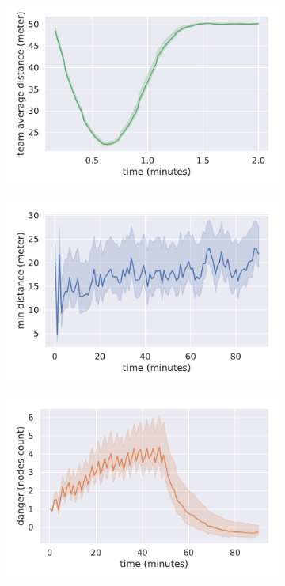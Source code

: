 \begin{figure}[t]
\centering
\begin{subfigure}{0.4\textwidth}
  \centering
  \includegraphics[width=\textwidth]{papers/coordination2023-macro/images/average_intra_team_distance}
  \caption{}
  \label{coordination2023-macro:fig:distance}
\end{subfigure}
\hfill
\begin{subfigure}{0.4\textwidth}
  \centering
  \includegraphics[width=\textwidth]{papers/coordination2023-macro/images/min_distance}
  \caption{}
  \label{coordination2023-macro:fig:min_distance}
\end{subfigure}
\hfill
\begin{subfigure}{0.4\textwidth}
  \centering
  \includegraphics[width=\textwidth]{papers/coordination2023-macro/images/in_danger}

\end{subfigure}
\end{figure}

